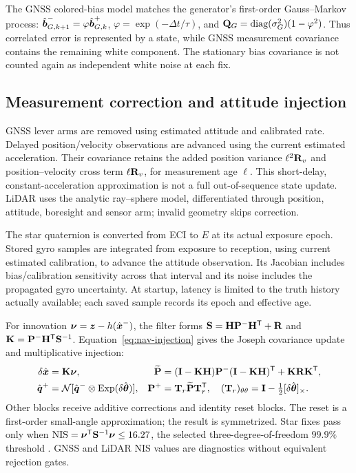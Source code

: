 The GNSS colored-bias model matches the generator's first-order Gauss--Markov process: $\hat{\boldsymbol{b}}_{G,k+1}^-=\varphi\hat{\boldsymbol{b}}_{G,k}^+$, $\varphi=\exp(-\Delta t/\tau)$, and $\mathbf{Q}_G=\operatorname{diag}(\sigma_G^2)(1-\varphi^2)$. Thus correlated error is represented by a state, while GNSS measurement covariance contains the remaining white component. The stationary bias covariance is not counted again as independent white noise at each fix.

\subsection{Measurement correction and attitude injection}
GNSS lever arms are removed using estimated attitude and calibrated rate. Delayed position/velocity observations are advanced using the current estimated acceleration. Their covariance retains the added position variance $\ell^2\mathbf{R}_v$ and position--velocity cross term $\ell\mathbf{R}_v$, for measurement age $\ell$. This short-delay, constant-acceleration approximation is not a full out-of-sequence state update. LiDAR uses the analytic ray--sphere model, differentiated through position, attitude, boresight and sensor arm; invalid geometry skips correction.

The star quaternion is converted from ECI to $E$ at its actual exposure epoch. Stored gyro samples are integrated from exposure to reception, using current estimated calibration, to advance the attitude observation. Its Jacobian includes bias/calibration sensitivity across that interval and its noise includes the propagated gyro uncertainty. At startup, latency is limited to the truth history actually available; each saved sample records its epoch and effective age.

For innovation $\boldsymbol{\nu}=\boldsymbol{z}-h(\hat{\boldsymbol{x}}^-)$, the filter forms $\mathbf{S}=\mathbf{H}\mathbf{P}^-\mathbf{H}^{\mathsf T}+\mathbf{R}$ and $\mathbf{K}=\mathbf{P}^-\mathbf{H}^{\mathsf T}\mathbf{S}^{-1}$. Equation~\eqref{eq:nav-injection} gives the Joseph covariance update and multiplicative injection:
\begin{equation}
\begin{aligned}
 \delta\hat{\boldsymbol{x}}&=\mathbf{K}\boldsymbol{\nu},&
 \widetilde{\mathbf{P}}&=(\mathbf{I}-\mathbf{K}\mathbf{H})\mathbf{P}^-(\mathbf{I}-\mathbf{K}\mathbf{H})^{\mathsf T}+\mathbf{K}\mathbf{R}\mathbf{K}^{\mathsf T},\\
 \hat{\boldsymbol{q}}^{+}&=\mathcal N[\hat{\boldsymbol{q}}^{-}\otimes\operatorname{Exp}(\delta\hat{\boldsymbol{\theta}})],&
 \mathbf{P}^{+}&=\mathbf{T}_r\widetilde{\mathbf{P}}\mathbf{T}_r^{\mathsf T},\quad
 (\mathbf{T}_r)_{\theta\theta}=\mathbf{I}-\tfrac12[\delta\hat{\boldsymbol{\theta}}]_\times.
\end{aligned}
\label{eq:nav-injection}
\end{equation}
Other blocks receive additive corrections and identity reset blocks. The reset is a first-order small-angle approximation; the result is symmetrized. Star fixes pass only when $\mathrm{NIS}=\boldsymbol{\nu}^{\mathsf T}\mathbf{S}^{-1}\boldsymbol{\nu}\le16.27$, the selected three-degree-of-freedom $99.9\%$ threshold \cite{nistchisquare}. GNSS and LiDAR NIS values are diagnostics without equivalent rejection gates.

